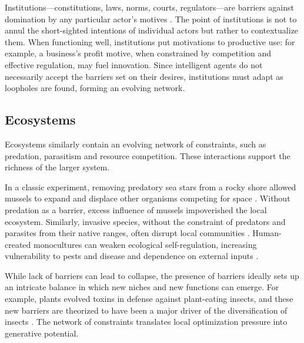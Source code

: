 \documentclass[11pt]{article}
\begin{document}
Institutions---constitutions, laws, norms, courts, regulators---are barriers against domination by any particular actor's motives \citep{north1990institutions, ostrom1990governing, leibo2025societal}. The point of institutions is not to annul the short-sighted intentions of individual actors but rather to contextualize them. When functioning well, institutions put motivations to productive use: for example, a business's profit motive, when constrained by competition and effective regulation, may fuel innovation. Since intelligent agents do not necessarily accept the barriers set on their desires, institutions must adapt as loopholes are found, forming an evolving network.




\subsection*{Ecosystems}

Ecosystems similarly contain an evolving network of constraints, such as predation, parasitism and resource competition. These interactions support the richness of the larger system. 

In a classic experiment, removing predatory sea stars from a rocky shore allowed mussels to expand and displace other organisms competing for space \citep{paine1966food}. Without predation as a barrier, excess influence of mussels impoverished the local ecosystem. Similarly, invasive species, without the constraint of predators and parasites from their native ranges, often disrupt local communities \citep{elton1958ecology}. Human-created monocultures can weaken ecological self-regulation, increasing vulnerability to pests and disease and dependence on external inputs \citep{altieri1999ecological,matson1997agricultural}. 

While lack of barriers can lead to collapse, the presence of barriers ideally sets up an intricate balance in which new niches and new functions can emerge. For example, plants evolved toxins in defense against plant-eating insects, and these new barriers are theorized to have been a major driver of the diversification of insects \citep{futuyma2009macroevolution}. The network of constraints translates local optimization pressure into generative potential.

\end{document}
